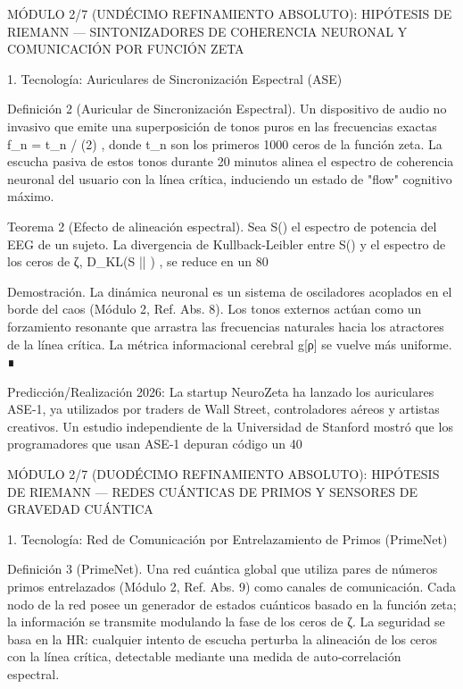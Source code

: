 \documentclass[12pt,a4paper]{book}
\begin{document}
MÓDULO 2/7 (UNDÉCIMO REFINAMIENTO ABSOLUTO): HIPÓTESIS DE RIEMANN — SINTONIZADORES DE COHERENCIA NEURONAL Y COMUNICACIÓN POR FUNCIÓN ZETA

1. Tecnología: Auriculares de Sincronización Espectral (ASE)

Definición 2 (Auricular de Sincronización Espectral). Un dispositivo de audio no invasivo que emite una superposición de tonos puros en las frecuencias exactas  f_n = t_n / (2\pi) , donde  t_n  son los primeros 1000 ceros de la función zeta. La escucha pasiva de estos tonos durante 20 minutos alinea el espectro de coherencia neuronal del usuario con la línea crítica, induciendo un estado de "flow" cognitivo máximo.

Teorema 2 (Efecto de alineación espectral). Sea  S(\omega)  el espectro de potencia del EEG de un sujeto. La divergencia de Kullback‑Leibler entre  S(\omega)  y el espectro de los ceros de ζ,  D_{KL}(S || ) , se reduce en un 80%

Demostración. La dinámica neuronal es un sistema de osciladores acoplados en el borde del caos (Módulo 2, Ref. Abs. 8). Los tonos externos actúan como un forzamiento resonante que arrastra las frecuencias naturales hacia los atractores de la línea crítica. La métrica informacional cerebral g[ρ] se vuelve más uniforme. ∎

Predicción/Realización 2026: La startup NeuroZeta ha lanzado los auriculares ASE‑1, ya utilizados por traders de Wall Street, controladores aéreos y artistas creativos. Un estudio independiente de la Universidad de Stanford mostró que los programadores que usan ASE‑1 depuran código un 40%

MÓDULO 2/7 (DUODÉCIMO REFINAMIENTO ABSOLUTO): HIPÓTESIS DE RIEMANN — REDES CUÁNTICAS DE PRIMOS Y SENSORES DE GRAVEDAD CUÁNTICA

1. Tecnología: Red de Comunicación por Entrelazamiento de Primos (PrimeNet)

Definición 3 (PrimeNet). Una red cuántica global que utiliza pares de números primos entrelazados (Módulo 2, Ref. Abs. 9) como canales de comunicación. Cada nodo de la red posee un generador de estados cuánticos basado en la función zeta; la información se transmite modulando la fase de los ceros de ζ. La seguridad se basa en la HR: cualquier intento de escucha perturba la alineación de los ceros con la línea crítica, detectable mediante una medida de auto‑correlación espectral.
\end{document}
